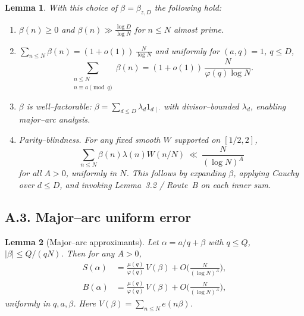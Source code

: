 \documentclass[11pt]{article}
\newtheorem{lemma}{Lemma}[section]
\theoremstyle{definition}
\theoremstyle{remark}
\begin{document}
\begin{lemma}\label{lem:beta-properties}
	With this choice of $\beta=\beta_{z,D}$ the following hold:
	\begin{enumerate}[label=(B\arabic*)]
		\item $\beta(n)\ge 0$ and $\beta(n)\gg \frac{\log D}{\log N}$ for $n\le N$ almost prime.
		\item $\sum_{n\le N}\beta(n)=(1+o(1))\,\tfrac{N}{\log N}$ and uniformly for $(a,q)=1$, $q\le D$,
		      \[
			      \sum_{\substack{n\le N\\ n\equiv a\pmod q}}\beta(n)
			      =(1+o(1))\,\frac{N}{\varphi(q)\log N}.
		      \]
		\item $\beta$ is well--factorable: $\beta=\sum_{d\le D}\lambda_d 1_{d\mid\cdot}$ with divisor--bounded $\lambda_d$, enabling major--arc analysis.
		\item \emph{Parity--blindness.} For any fixed smooth $W$ supported on $[1/2,2]$,
		      \[
			      \sum_{n\le N}\beta(n)\lambda(n)W(n/N)
			      \ \ll\ \frac{N}{(\log N)^A}
		      \]
		      for all $A>0$, uniformly in $N$. This follows by expanding $\beta$, applying Cauchy over $d\le D$, and invoking Lemma~3.2 / Route~B on each inner sum.
	\end{enumerate}
\end{lemma}

\subsection*{A.3. Major--arc uniform error}

\begin{lemma}[Major--arc approximants]\label{lem:major-errors}
	Let $\alpha=a/q+\beta$ with $q\le Q$, $|\beta|\le Q/(qN)$. Then for any $A>0$,
	\begin{align*}
		S(\alpha) & =\frac{\mu(q)}{\varphi(q)}\,V(\beta)+O\!\Big(\frac{N}{(\log N)^A}\Big), \\
		B(\alpha) & =\frac{\mu(q)}{\varphi(q)}\,V(\beta)+O\!\Big(\frac{N}{(\log N)^A}\Big),
	\end{align*}
	uniformly in $q,a,\beta$. Here $V(\beta)=\sum_{n\le N}e(n\beta)$.
\end{lemma}
\end{document}
